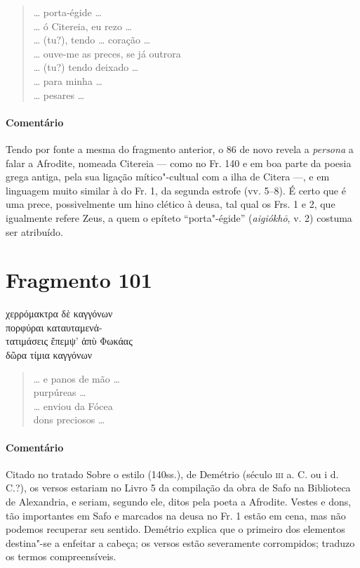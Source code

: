 \begin{verse}
\ldots{} porta-égide \ldots{}\\
\ldots{} ó Citereia, eu rezo \ldots{}\\
\ldots{} (tu?), tendo \ldots{} coração \ldots{}\\
\ldots{} ouve-me as preces, se já outrora\\
\ldots{} (tu?) tendo deixado \ldots{}\\
\ldots{} para minha \ldots{}\\
\ldots{} pesares \ldots{}
\end{verse}

{\paragraph{Comentário} Tendo por fonte a mesma do fragmento anterior, o 86 de novo revela a \textit{persona} a falar a Afrodite, nomeada Citereia --- como no Fr. 140 e em boa parte da poesia grega antiga, pela sua ligação mítico"-cultual com a ilha de Citera ---, e em linguagem muito similar à do Fr. 1, da segunda estrofe (vv. 5--8). É certo que é uma prece, possivelmente um hino clético à deusa, tal qual os Frs. 1 e 2, que igualmente refere Zeus, a quem o epíteto ``porta"-égide'' (\textit{aigiókhō}, v. 2) costuma ser atribuído.}

\pagebreak

\section{Fragmento 101}

\begin{gkverse}
χερρόμακτρα δὲ \dagger{}καγγόνων\dagger{}\\
πορφύραι \dagger{}καταυταμενἀ-\\
τατιμάσεις\dagger{} ἔπεμψ’ ἀπὺ Φωκάας\\
δῶρα τίμια \dagger{}καγγόνων\dagger{}\\
\end{gkverse}

\begin{verse}
\ldots{} e panos de mão \ldots{}\\
purpúreas \ldots{}\\
\ldots{} enviou da Fócea\\
dons preciosos \ldots{}
\end{verse}

{\paragraph{Comentário} Citado no tratado Sobre o estilo (140ss.), de Demétrio (século \textsc{iii} a. C. ou i d. C.?), os versos estariam no Livro 5 da compilação da obra de Safo na Biblioteca de Alexandria, e seriam, segundo ele, ditos pela poeta a Afrodite. Vestes e dons, tão importantes em Safo e marcados na deusa no Fr. 1 estão em cena, mas não podemos recuperar seu sentido. Demétrio explica que o primeiro dos elementos destina"-se a enfeitar a cabeça; os versos estão severamente corrompidos; traduzo os termos compreensíveis.}

